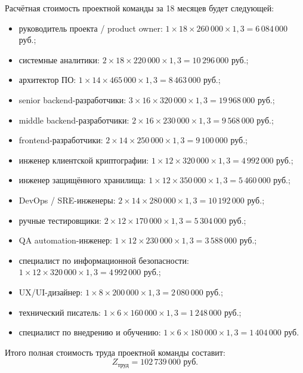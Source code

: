 Расчётная стоимость проектной команды за 18 месяцев будет следующей:

\begin{itemize}
  \item руководитель проекта / product owner:
  $1 \times 18 \times 260\,000 \times 1{,}3 = 6\,084\,000$ руб.;
  \item системные аналитики:
  $2 \times 18 \times 220\,000 \times 1{,}3 = 10\,296\,000$ руб.;
  \item архитектор ПО:
  $1 \times 14 \times 465\,000 \times 1{,}3 = 8\,463\,000$ руб.;
  \item senior backend-разработчики:
  $3 \times 16 \times 320\,000 \times 1{,}3 = 19\,968\,000$ руб.;
  \item middle backend-разработчики:
  $2 \times 16 \times 230\,000 \times 1{,}3 = 9\,568\,000$ руб.;
  \item frontend-разработчики:
  $2 \times 14 \times 250\,000 \times 1{,}3 = 9\,100\,000$ руб.;
  \item инженер клиентской криптографии:
  $1 \times 12 \times 320\,000 \times 1{,}3 = 4\,992\,000$ руб.;
  \item инженер защищённого хранилища:
  $1 \times 12 \times 350\,000 \times 1{,}3 = 5\,460\,000$ руб.;
  \item DevOps / SRE-инженеры:
  $2 \times 14 \times 280\,000 \times 1{,}3 = 10\,192\,000$ руб.;
  \item ручные тестировщики:
  $2 \times 12 \times 170\,000 \times 1{,}3 = 5\,304\,000$ руб.;
  \item QA automation-инженер:
  $1 \times 12 \times 230\,000 \times 1{,}3 = 3\,588\,000$ руб.;
  \item специалист по информационной безопасности:
  $1 \times 12 \times 320\,000 \times 1{,}3 = 4\,992\,000$ руб.;
  \item UX/UI-дизайнер:
  $1 \times 8 \times 200\,000 \times 1{,}3 = 2\,080\,000$ руб.;
  \item технический писатель:
  $1 \times 6 \times 160\,000 \times 1{,}3 = 1\,248\,000$ руб.;
  \item специалист по внедрению и обучению:
  $1 \times 6 \times 180\,000 \times 1{,}3 = 1\,404\,000$ руб.
\end{itemize}

Итого полная стоимость труда проектной команды составит:
\begin{equation}
Z_{\text{труд}} = 102\,739\,000 \text{ руб.}
\label{eq:dev-labor-cost}
\end{equation}

